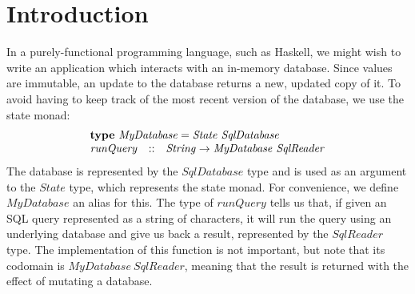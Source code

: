 \section{Introduction}
\label{sec:introduction}

In a purely-functional programming language, such as Haskell, we might wish to write an application which interacts with an in-memory database. Since values are immutable, an update to the database returns a new, updated copy of it. To avoid having to keep track of the most recent version of the database, we use the state monad:
\begin{displaymath}
\begin{array}{lcl}
\multicolumn{3}{l}{\mathbf{type}~\mathit{MyDatabase} = \mathit{State}~\mathit{SqlDatabase}}\\
\mathit{runQuery} & :: & \mathit{String} \to \mathit{MyDatabase}~\mathit{SqlReader}
\end{array}
\end{displaymath}
The database is represented by the $\mathit{SqlDatabase}$ type and is used as an argument to the $\mathit{State}$ type, which represents the state monad. For convenience, we define $\mathit{MyDatabase}$ an alias for this. The type of $\mathit{runQuery}$ tells us that, if given an SQL query represented as a string of characters, it will run the query using an underlying database and give us back a result, represented by the $\mathit{SqlReader}$ type. The implementation of this function is not important, but note that its codomain is $\mathit{MyDatabase}~\mathit{SqlReader}$, meaning that the result is returned with the effect of mutating a database. 

